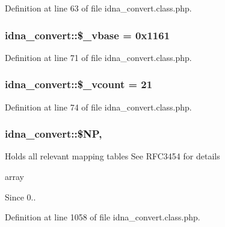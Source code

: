 Definition at line 63 of file idna\-\_\-convert.\-class.\-php.

\hypertarget{classidna__convert_a2e984a3fe1e2e4d5192dd9a5220e9c29}{
\subsubsection[{\$\-\_\-vbase}]{\setlength{\rightskip}{0pt plus 5cm}idna\-\_\-convert\-::\$\-\_\-vbase = 0x1161\hspace{0.3cm}{\ttfamily [protected]}}}\label{classidna__convert_a2e984a3fe1e2e4d5192dd9a5220e9c29}


Definition at line 71 of file idna\-\_\-convert.\-class.\-php.

\hypertarget{classidna__convert_afe217921aaa9aa954361f3aa090c69c1}{
\subsubsection[{\$\-\_\-vcount}]{\setlength{\rightskip}{0pt plus 5cm}idna\-\_\-convert\-::\$\-\_\-vcount = 21\hspace{0.3cm}{\ttfamily [protected]}}}\label{classidna__convert_afe217921aaa9aa954361f3aa090c69c1}


Definition at line 74 of file idna\-\_\-convert.\-class.\-php.

\hypertarget{classidna__convert_a82881f4c426f3e6603e252c8bebc875f}{
\subsubsection[{\$\-N\-P}]{\setlength{\rightskip}{0pt plus 5cm}idna\-\_\-convert\-::\$\-N\-P\hspace{0.3cm}{\ttfamily [static]}, {\ttfamily [protected]}}}\label{classidna__convert_a82881f4c426f3e6603e252c8bebc875f}
Holds all relevant mapping tables See R\-F\-C3454 for details

array \begin{DoxySince}{Since}
0.. 
\end{DoxySince}


Definition at line 1058 of file idna\-\_\-convert.\-class.\-php.

